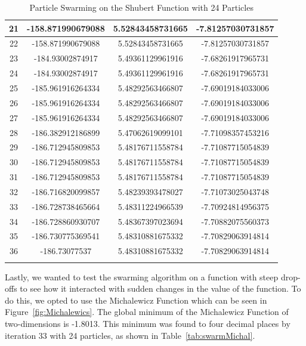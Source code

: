\documentclass[oneside,12pt,openany]{book}
\begin{document}
\begin{longtable}[c]{|c|c|c|c|}
        21 & -158.871990679088 & 5.52843458731665 & -7.81257030731857 \\ \hline
        22 & -158.871990679088 & 5.52843458731665 & -7.81257030731857 \\ \hline
        23 & -184.93002874917 & 5.49361129961916 & -7.68261917965731 \\ \hline
        24 & -184.93002874917 & 5.49361129961916 & -7.68261917965731 \\ \hline
        25 & -185.961916264334 & 5.48292563466807 & -7.69019184033006 \\ \hline
        26 & -185.961916264334 & 5.48292563466807 & -7.69019184033006 \\ \hline
        27 & -185.961916264334 & 5.48292563466807 & -7.69019184033006 \\ \hline
        28 & -186.382912186899 & 5.47062619099101 & -7.71098357453216 \\ \hline
        29 & -186.712945809853 & 5.48176711558784 & -7.71087715054839 \\ \hline
        30 & -186.712945809853 & 5.48176711558784 & -7.71087715054839 \\ \hline
        31 & -186.712945809853 & 5.48176711558784 & -7.71087715054839 \\ \hline
        32 & -186.716820099857 & 5.48239393478027 & -7.71073025043748 \\ \hline
        33 & -186.728738465664 & 5.48311224966539 & -7.70924814956375 \\ \hline
        34 & -186.728860930707 & 5.48367397023694 & -7.70882075560373 \\ \hline
        35 & -186.730775369541 & 5.48310881675332 & -7.70829063914814 \\ \hline
        36 & -186.73077537 & 5.48310881675332 & -7.70829063914814 \\ \hline
        \caption{Particle Swarming on the Shubert Function with 24 Particles}
        \label{tab:swarmShubert}\\
    \end{longtable}

    \FloatBarrier
    
    Lastly, we wanted to test the swarming algorithm on a function with steep drop-offs to see how it interacted with sudden changes in the value of the function. To do this, we opted to use the Michalewicz Function which can be seen in Figure~\ref{fig:Michalewics}. The global minimum of the Michalewicz Function of two-dimensions is -1.8013. This minimum was found to four decimal places by iteration 33 with 24 particles, as shown in Table~\ref{tab:swarmMichal}.
    
\end{document}
